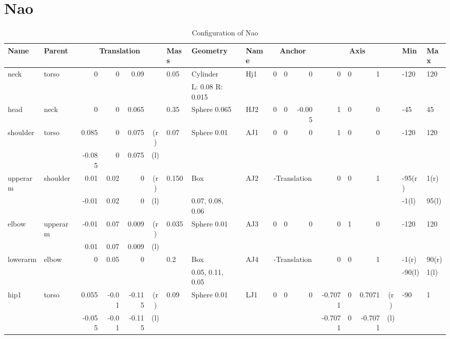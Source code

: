 \section{Nao}
\begin{landscape}
\begin{table}
  \centering
  \label{table:nao-conf}
  \caption{Configuration of Nao}
  \newcommand{\threegrid}[1]{\multicolumn{3}{c|}{#1}}
  \newcommand{\fourgrid}[1]{\multicolumn{4}{c|}{#1}}
  \begin{tabular}{|l|l|r@{,}r@{,}r@{}c|l|l|l|r@{,}r@{,}r|r@{,}r@{,}r@{}c|l|l|}
    \hline
    {\bf Name} & {\bf Parent} & \fourgrid{\bf Translation} &
    {\bf Mass} & {\bf Geometry} & {\bf Name} & \threegrid{\bf
      Anchor} & \fourgrid{\bf Axis} & {\bf Min} & {\bf Max} \\
    \hline
    neck & torso & 0&0&0.09& & 0.05 & Cylinder & Hj1 & 0&0&0 & 0&0&1& &
    -120 & 120\\
    & & \fourgrid{} & & L: 0.08 R: 0.015 & & \threegrid{} & \fourgrid{} & &\\
    \hline
    head & neck & 0&0&0.065& & 0.35 & Sphere 0.065 & HJ2 & 0&0&-0.005 &
    1&0&0& & -45 & 45\\
    \hline
    shoulder & torso & 0.085&0&0.075&(r)  & 0.07 & Sphere 0.01& AJ1 &
    0&0&0 & 1&0&0& & -120 & 120 \\
    & & -0.085 & 0 & 0.075&(l) & & & & \threegrid{} & \fourgrid{} & & \\
    \hline
    upperarm & shoulder & 0.01&0.02&0&(r) & 0.150 &
    Box & AJ2 & \threegrid{-Translation} & 0&0&1& & -95(r) & 1(r)  \\
    & & -0.01 & 0.02 & 0&(l) & & 0.07, 0.08, 0.06 & & \threegrid{} & \fourgrid{} & -1(l) & 95(l) \\
    \hline
    elbow & upperarm & -0.01&0.07&0.009&(r) &
    0.035 & Sphere 0.01 & AJ3 & 0&0&0 & 0&1&0& & -120 & 120 \\
    & & 0.01 & 0.07 & 0.009&(l) & & & & \threegrid{} & \fourgrid{} & &\\
    \hline
    lowerarm & elbow & 0&0.05&0& & 0.2 & Box & AJ4 &
    \threegrid{-Translation} & 0&0&1& & -1(r) & 90(r) \\
    & & \fourgrid{} & & 0.05, 0.11, 0.05 & & \threegrid{} & \fourgrid{} & -90(l) & 1(l) \\
    \hline
    hip1 & torso & 0.055&-0.01&-0.115&(r) &
    0.09 & Sphere 0.01 & LJ1 & 0&0&0 & -0.7071&0&0.7071&(r)  & -90 & 1 \\
    & & -0.055 & -0.01 & -0.115&(l) & & & & \threegrid{} & -0.7071&0&-0.7071&(l) & &\\

\end{tabular}
\end{table}
\end{landscape}
